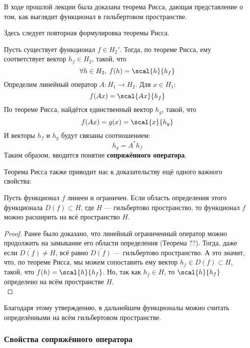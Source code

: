 	В ходе прошлой лекции была доказана теорема Рисса, дающая представление о том, как выглядит функционал в гильбертовом пространстве.
	
	{\color{gray}
		Здесь следует повторная формулировка теоремы Рисса.
	}
	
	Пусть существует функционал $f \in H_2'$. Тогда, по теореме Рисса, ему соответствует вектор $h_f \in H_2$, такой, что 
	$$\forall h \in H_2, \: f(h) = \scal{h}{h_f}$$
	Определим линейный оператор $A : H_1 \rightarrow H_2$. Для $x \in H_1$: 
	$$f(Ax) = \scal{Ax}{h_f}$$
	По теореме Рисса, найдётся единственный вектор $h_g$, такой, что 
	$$f(Ax) = g(x) = \scal{x}{h_g}$$
	И векторы $h_f$ и $h_g$ будут связаны соотношением:
	$$h_g = A^{*}h_f$$
	Таким образом, вводится понятие \textbf{сопряжённого оператора}.

	Теорема Рисса также приводит нас к доказательству ещё одного важного свойства:
	\begin{state}
		Пусть функционал $f$ линеен и ограничен. Если область определения этого функционала $D(f) \subset H$, 
		где $H$ --- гильбертово пространство, то функционал $f$ можно расширить на всё пространство $H$.
	\end{state}
	\begin{proof}
		Ранее было доказано, что линейный ограниченный оператор можно продолжить на замыкание его области определения 
		(Теорема ??). Тогда, даже если $\overline{D(f)} \neq H$, всё равно $\overline{D(f)}$ --- гильбертово пространство.
		А это значит, что, по теореме Рисса, мы можем сопоставить ему вектор $h_f \in \overline{D(f)} \subset H$, такой, что 
		$f(h) = \scal{h}{h_f}$. Но, так как $h_f \in H$, то $\scal{h}{h_f}$ определено на всём пространстве $H$. \\
	\end{proof}
	
	Благодаря этому утверждению, в дальнейшем функционалы можно считать определёнными на всём гильбертовом пространстве.
	
	\subsubsection{Свойства сопряжённого оператора}
	
